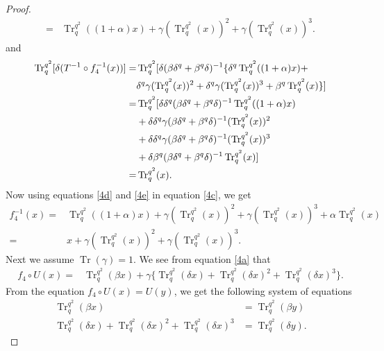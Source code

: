 \documentclass{birkjour}
\theoremstyle{definition}
\theoremstyle{remark}
\numberwithin{equation}{section}
\begin{document}
\begin{proof}
\begin{align}
	=&\operatorname{Tr}_{q}^{q^2}((1+\alpha)x)+\gamma(\operatorname{Tr}_{q}^{q^2}(x))^2+\gamma(\operatorname{Tr}_{q}^{q^2}(x))^3.\label{4d}
\end{align}
and
\begin{align}
	\operatorname{Tr}_{q}^{q^2}[\delta (T^{-1}\circ f_4^{-1}(x))]=&\operatorname{Tr}_{q}^{q^2}[\delta (\beta\delta^{q}+\beta^{q}\delta)^{-1}\{\delta^{q}\operatorname{Tr}_{q}^{q^2}((1+\alpha)x)+\notag\\&\delta^{q}\gamma(\operatorname{Tr}_{q}^{q^2}(x))^2+\delta^{q}\gamma(\operatorname{Tr}_{q}^{q^2}(x))^3+\beta^{q}\operatorname{Tr}_{q}^{q^2}(x)\}]\notag\\
	=&\operatorname{Tr}_{q}^{q^2}[\delta\delta^{q}(\beta\delta^{q}+\beta^{q}\delta)^{-1}\operatorname{Tr}_{q}^{q^2}((1+\alpha)x)\notag\\&+\delta\delta^{q}\gamma(\beta\delta^{q}+\beta^{q}\delta)^{-1}(\operatorname{Tr}_{q}^{q^2}(x))^2\notag\\&+\delta\delta^{q}\gamma(\beta\delta^{q}+\beta^{q}\delta)^{-1}(\operatorname{Tr}_{q}^{q^2}(x))^3\notag\\&+\delta\beta^{q}(\beta\delta^{q}+\beta^{q}\delta)^{-1}\operatorname{Tr}_{q}^{q^2}(x)]\notag\\
	=&\operatorname{Tr}_{q}^{q^2}(x).\label{4e}
\end{align}
Now using equations \ref{4d} and \ref{4e} in equation \ref{4c}, we get
\begin{align*}
	f_4^{-1}(x)=&\operatorname{Tr}_{q}^{q^2}((1+\alpha)x)+\gamma(\operatorname{Tr}_{q}^{q^2}(x))^2+\gamma(\operatorname{Tr}_{q}^{q^2}(x))^3+\alpha\operatorname{Tr}_{q}^{q^2}(x)\\
	=&x+\gamma(\operatorname{Tr}_{q}^{q^2}(x))^2+\gamma(\operatorname{Tr}_{q}^{q^2}(x))^3.
\end{align*}
Next we assume $\operatorname{Tr}(\gamma)=1$. We see from equation \ref{4a} that
\begin{align}
	f_4\circ U(x)=&\operatorname{Tr}_q^{q^2}(\beta x)+\gamma\{\operatorname{Tr}_q^{q^2}(\delta x)+\operatorname{Tr}_q^{q^2}(\delta x)^2+\operatorname{Tr}_q^{q^2}(\delta x)^3\}.\label{4f}
\end{align}
From the equation $f_4 \circ U(x)=U(y)$, we get the following system of equations
\begin{align*}
	\operatorname{Tr}_q^{q^2}(\beta x)&=\operatorname{Tr}_q^{q^2}(\beta y)\\
	\operatorname{Tr}_q^{q^2}(\delta x)+\operatorname{Tr}_q^{q^2}(\delta x)^2+\operatorname{Tr}_q^{q^2}(\delta x)^3&=\operatorname{Tr}_q^{q^2}(\delta y).

\end{align*}
\end{proof}
\end{document}
